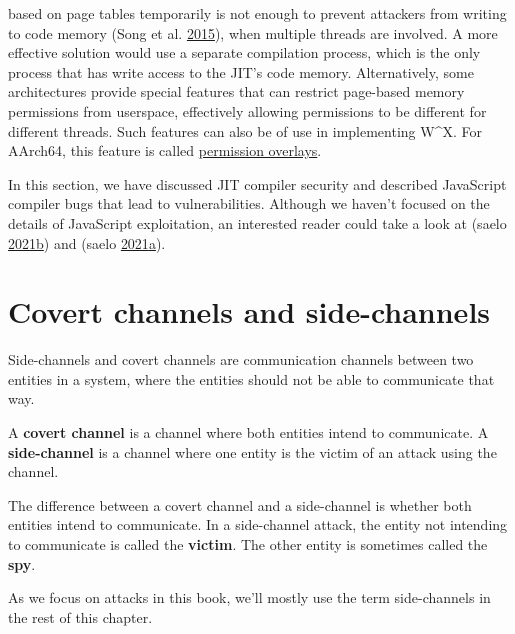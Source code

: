 \documentclass[a4paper,]{report}
\begin{document}
\begin{enumerate}
  based on page tables temporarily is not enough to prevent attackers
  from writing to code memory (Song et al.
  \protect\hyperlink{ref-Song2015}{2015}), when multiple threads are
  involved. A more effective solution would use a separate compilation
  process, which is the only process that has write access to the JIT's
  code memory. Alternatively, some architectures provide special
  features that can restrict page-based memory permissions from
  userspace, effectively allowing permissions to be different for
  different threads. Such features can also be of use in implementing
  W\^{}X. For AArch64, this feature is called
  \href{https://developer.arm.com/documentation/102376/0200/Permission-indirection-and-permission-overlay-extensions}{permission
  overlays}.
\end{enumerate}

In this section, we have discussed JIT compiler security and described
JavaScript compiler bugs that lead to vulnerabilities. Although we
haven't focused on the details of JavaScript exploitation, an interested
reader could take a look at (saelo
\protect\hyperlink{ref-saelo2021a}{2021}\protect\hyperlink{ref-saelo2021a}{b})
and (saelo
\protect\hyperlink{ref-saelo2021b}{2021}\protect\hyperlink{ref-saelo2021b}{a}).

\hypertarget{covert-channels-and-side-channels}{%
\chapter{Covert channels and
side-channels}\label{covert-channels-and-side-channels}}

Side-channels and covert channels are communication channels between two
entities in a system, where the entities should not be able to
communicate that way.

A \textbf{covert channel} is a channel where both
entities intend to communicate. A
\textbf{side-channel} is a channel where one entity
is the victim of an attack using the channel.

The difference between a covert channel and a side-channel is whether
both entities intend to communicate. In a side-channel attack, the
entity not intending to communicate is called the
\textbf{victim}. The other entity is sometimes called the
\textbf{spy}.

As we focus on attacks in this book, we'll mostly use the term
side-channels in the rest of this chapter.
\end{document}
